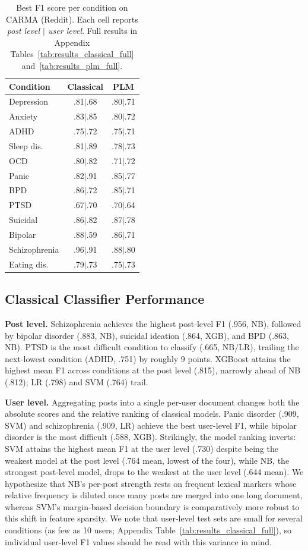 \documentclass[11pt]{article}
\begin{document}
\begin{table}[t]
\centering
\small
\begin{tabular}{lcc}
\toprule
\textbf{Condition} & \textbf{Classical} & \textbf{PLM} \\
\midrule
Depression & .81$|$.68 & .80$|$.71 \\
Anxiety & .83$|$.85 & .80$|$.72 \\
ADHD & .75$|$.72 & .75$|$.71 \\
Sleep dis. & .81$|$.89 & .78$|$.73 \\
OCD & .80$|$.82 & .71$|$.72 \\
Panic & .82$|$.91 & .85$|$.77 \\
BPD & .86$|$.72 & .85$|$.71 \\
PTSD & .67$|$.70 & .70$|$.64 \\
Suicidal & .86$|$.82 & .87$|$.78 \\
Bipolar & .88$|$.59 & .86$|$.71 \\
Schizophrenia & .96$|$.91 & .88$|$.80 \\
Eating dis. & .79$|$.73 & .75$|$.73 \\
\bottomrule
\end{tabular}
\caption{Best F1 score per condition on CARMA (Reddit). Each cell reports \textit{post level $|$ user level}. Full results in Appendix Tables~\ref{tab:results_classical_full} and~\ref{tab:results_plm_full}.}
\label{tab:results_summary}
\end{table}

\subsection{Classical Classifier Performance}

\textbf{Post level.} Schizophrenia achieves the highest post-level F1 (.956, NB), followed by bipolar disorder (.883, NB), suicidal ideation (.864, XGB), and BPD (.863, NB). PTSD is the most difficult condition to classify (.665, NB/LR), trailing the next-lowest condition (ADHD, .751) by roughly 9 points. XGBoost attains the highest mean F1 across conditions at the post level (.815), narrowly ahead of NB (.812); LR (.798) and SVM (.764) trail.

\textbf{User level.} Aggregating posts into a single per-user document changes both the absolute scores and the relative ranking of classical models. Panic disorder (.909, SVM) and schizophrenia (.909, LR) achieve the best user-level F1, while bipolar disorder is the most difficult (.588, XGB). Strikingly, the model ranking inverts: SVM attains the highest mean F1 at the user level (.730) despite being the weakest model at the post level (.764 mean, lowest of the four), while NB, the strongest post-level model, drops to the weakest at the user level (.644 mean). We hypothesize that NB's per-post strength rests on frequent lexical markers whose relative frequency is diluted once many posts are merged into one long document, whereas SVM's margin-based decision boundary is comparatively more robust to this shift in feature sparsity. We note that user-level test sets are small for several conditions (as few as 10 users; Appendix Table~\ref{tab:results_classical_full}), so individual user-level F1 values should be read with this variance in mind.
\end{document}
